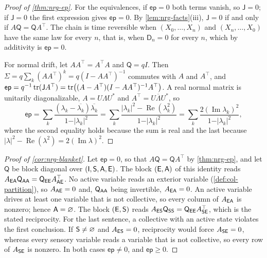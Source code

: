 \begin{proof}[Proof of \cref{thm:nrg-ep}]
For the equivalences, if $\mathsf{ep}=0$ both terms vanish, so $\mathsf J=0$; if $\mathsf J=0$ the first expression gives $\mathsf{ep}=0$. By \cref{lem:nrg-facts}(iii), $\mathsf J=0$ if and only if $A\mathsf Q=\mathsf QA^\top$. The chain is time reversible when $(X_0,\dots,X_n)$ and $(X_n,\dots,X_0)$ have the same law for every $n$, that is, when $\mathsf D_n=0$ for every $n$, which by additivity is $\mathsf{ep}=0$.

For normal drift, let $AA^\top=A^\top A$ and $\mathsf Q=qI$. Then $\Sigma=q\sum_k(AA^\top)^k=q(I-AA^\top)^{-1}$ commutes with $A$ and $A^\top$, and $\mathsf{ep}=q^{-1}\operatorname{tr}(\mathsf JA^\top)=\operatorname{tr}\bigl((A-A^\top)(I-AA^\top)^{-1}A^\top\bigr)$. A real normal matrix is unitarily diagonalizable, $A=U\Lambda U^*$ and $A^\top=U\overline\Lambda U^*$, so
\[
\mathsf{ep}=\sum_k\frac{(\lambda_k-\overline{\lambda_k})\overline{\lambda_k}}{1-\vert\lambda_k\vert^2}=\sum_k\frac{\vert\lambda_k\vert^2-\operatorname{Re}(\lambda_k^2)}{1-\vert\lambda_k\vert^2}=\sum_k\frac{2(\operatorname{Im}\lambda_k)^2}{1-\vert\lambda_k\vert^2},
\]
where the second equality holds because the sum is real and the last because $\vert\lambda\vert^2-\operatorname{Re}(\lambda^2)=2(\operatorname{Im}\lambda)^2$.
\end{proof}

\begin{proof}[Proof of \cref{cor:nrg-blanket}]
Let $\mathsf{ep}=0$, so that $A\mathsf Q=\mathsf QA^\top$ by \cref{thm:nrg-ep}, and let $\mathsf Q$ be block diagonal over $(\mathsf{I},\mathsf{S},\mathsf{A},\mathsf{E})$. The block $(\mathsf{E},\mathsf{A})$ of this identity reads $A_{\mathsf{E}\mathsf{A}}\mathsf Q_{\mathsf{A}\mathsf{A}}=\mathsf Q_{\mathsf{E}\mathsf{E}}A_{\mathsf{A}\mathsf{E}}^\top$. No active variable reads an exterior variable (\cref{def:col-partition}), so $A_{\mathsf{A}\mathsf{E}}=0$ and, $\mathsf Q_{\mathsf{A}\mathsf{A}}$ being invertible, $A_{\mathsf{E}\mathsf{A}}=0$. An active variable drives at least one variable that is not collective, so every column of $A_{\mathsf{E}\mathsf{A}}$ is nonzero; hence $\mathsf{A}=\varnothing$. The block $(\mathsf{E},\mathsf{S})$ reads $A_{\mathsf{E}\mathsf{S}}\mathsf Q_{\mathsf{S}\mathsf{S}}=\mathsf Q_{\mathsf{E}\mathsf{E}}A_{\mathsf{S}\mathsf{E}}^\top$, which is the stated reciprocity. For the last sentence, a collective with an active state violates the first conclusion. If $\mathsf{S}\neq\varnothing$ and $A_{\mathsf{E}\mathsf{S}}=0$, reciprocity would force $A_{\mathsf{S}\mathsf{E}}=0$, whereas every sensory variable reads a variable that is not collective, so every row of $A_{\mathsf{S}\mathsf{E}}$ is nonzero. In both cases $\mathsf{ep}\neq0$, and $\mathsf{ep}\ge0$.
\end{proof}

